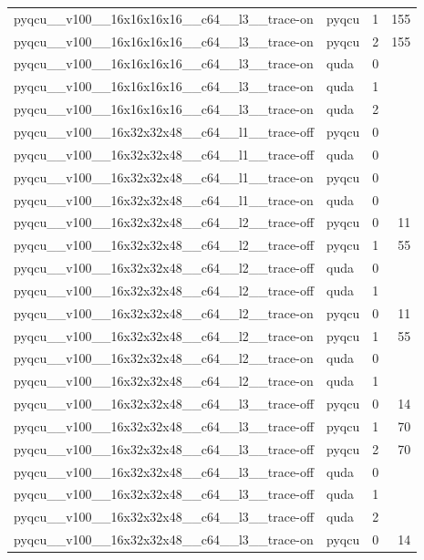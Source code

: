 \begin{table}[htbp]
\begin{tabular}{@{}llrr@{}}
pyqcu\_\_v100\_\_16x16x16x16\_\_c64\_\_l3\_\_trace-on & pyqcu & 1 & 155 \\
pyqcu\_\_v100\_\_16x16x16x16\_\_c64\_\_l3\_\_trace-on & pyqcu & 2 & 155 \\
pyqcu\_\_v100\_\_16x16x16x16\_\_c64\_\_l3\_\_trace-on & quda & 0 &  \\
pyqcu\_\_v100\_\_16x16x16x16\_\_c64\_\_l3\_\_trace-on & quda & 1 &  \\
pyqcu\_\_v100\_\_16x16x16x16\_\_c64\_\_l3\_\_trace-on & quda & 2 &  \\
pyqcu\_\_v100\_\_16x32x32x48\_\_c64\_\_l1\_\_trace-off & pyqcu & 0 &  \\
pyqcu\_\_v100\_\_16x32x32x48\_\_c64\_\_l1\_\_trace-off & quda & 0 &  \\
pyqcu\_\_v100\_\_16x32x32x48\_\_c64\_\_l1\_\_trace-on & pyqcu & 0 &  \\
pyqcu\_\_v100\_\_16x32x32x48\_\_c64\_\_l1\_\_trace-on & quda & 0 &  \\
pyqcu\_\_v100\_\_16x32x32x48\_\_c64\_\_l2\_\_trace-off & pyqcu & 0 & 11 \\
pyqcu\_\_v100\_\_16x32x32x48\_\_c64\_\_l2\_\_trace-off & pyqcu & 1 & 55 \\
pyqcu\_\_v100\_\_16x32x32x48\_\_c64\_\_l2\_\_trace-off & quda & 0 &  \\
pyqcu\_\_v100\_\_16x32x32x48\_\_c64\_\_l2\_\_trace-off & quda & 1 &  \\
pyqcu\_\_v100\_\_16x32x32x48\_\_c64\_\_l2\_\_trace-on & pyqcu & 0 & 11 \\
pyqcu\_\_v100\_\_16x32x32x48\_\_c64\_\_l2\_\_trace-on & pyqcu & 1 & 55 \\
pyqcu\_\_v100\_\_16x32x32x48\_\_c64\_\_l2\_\_trace-on & quda & 0 &  \\
pyqcu\_\_v100\_\_16x32x32x48\_\_c64\_\_l2\_\_trace-on & quda & 1 &  \\
pyqcu\_\_v100\_\_16x32x32x48\_\_c64\_\_l3\_\_trace-off & pyqcu & 0 & 14 \\
pyqcu\_\_v100\_\_16x32x32x48\_\_c64\_\_l3\_\_trace-off & pyqcu & 1 & 70 \\
pyqcu\_\_v100\_\_16x32x32x48\_\_c64\_\_l3\_\_trace-off & pyqcu & 2 & 70 \\
pyqcu\_\_v100\_\_16x32x32x48\_\_c64\_\_l3\_\_trace-off & quda & 0 &  \\
pyqcu\_\_v100\_\_16x32x32x48\_\_c64\_\_l3\_\_trace-off & quda & 1 &  \\
pyqcu\_\_v100\_\_16x32x32x48\_\_c64\_\_l3\_\_trace-off & quda & 2 &  \\
pyqcu\_\_v100\_\_16x32x32x48\_\_c64\_\_l3\_\_trace-on & pyqcu & 0 & 14 \\

\end{tabular}
\end{table}
